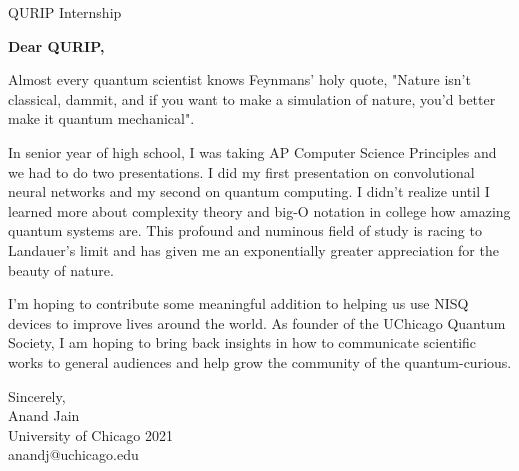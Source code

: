 \documentclass[11pt,a4paper]{letter} %
\begin{document}
\begin{letter}{QURIP Internship} 

\opening{\textbf{Dear QURIP,}}

Almost every quantum scientist knows Feynmans’ holy quote, "Nature isn't classical, dammit, and if you want to make a simulation of nature, you'd better make it quantum mechanical".

In senior year of high school, I was taking AP Computer Science Principles and we had to do two presentations. I did my first presentation on convolutional neural networks and my second on quantum computing. 
I didn’t realize until I learned more about complexity theory and big-O notation in college how amazing quantum systems are. 
This profound and numinous field of study is racing to Landauer's limit and has given me an exponentially greater appreciation for the beauty of nature.

I'm hoping to contribute some meaningful addition to helping us use NISQ devices to improve lives around the world.
As founder of the UChicago Quantum Society, I am hoping to bring back insights in how to communicate scientific works to general audiences and help grow the community of the quantum-curious.


\closing{Sincerely, \\ Anand Jain \\ University of Chicago 2021 \\ anandj@uchicago.edu}

\end{letter}
 
\end{document}
